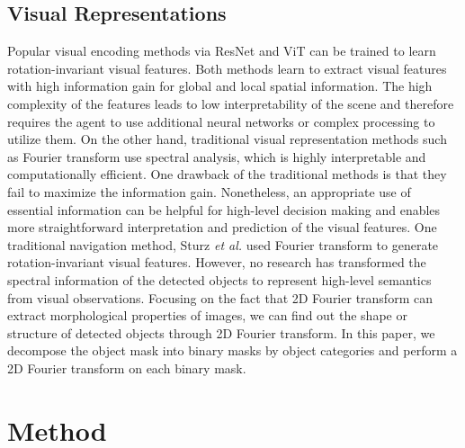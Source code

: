 \documentclass[10pt,twocolumn,letterpaper]{article}
\begin{document}
\subsection{Visual Representations}
\vspace{-0.15cm}
\font=2.3pt
Popular visual encoding methods via ResNet \cite{he2016deep} and ViT \cite{dosovitskiy2020vit} can be trained to learn rotation-invariant visual features. Both methods learn to extract visual features with high information gain for global and local spatial information. The high complexity of the features leads to low interpretability of the scene and therefore requires the agent to use additional neural networks or complex processing to utilize them. On the other hand, traditional visual representation methods such as Fourier transform use spectral analysis, which is highly interpretable and computationally efficient. One drawback of the traditional methods is that they fail to maximize the information gain. Nonetheless, an appropriate use of essential information can be helpful for high-level decision making and enables more straightforward interpretation and prediction of the visual features.
One traditional navigation method, Sturz \textit{et al.} \cite{sturzl2006efficient} used Fourier transform to generate rotation-invariant visual features. However, no research has transformed the spectral information of the detected objects to represent high-level semantics from visual observations. Focusing on the fact that 2D Fourier transform can extract morphological properties of images\cite{Serra2020-mathmorphology}, we can find out the shape or structure of detected objects through 2D Fourier transform. In this paper, we decompose the object mask into binary masks by object categories and perform a 2D Fourier transform on each binary mask.
\vspace{-0.1cm}

\section{Method}
\vspace{-0.1cm}
\end{document}
